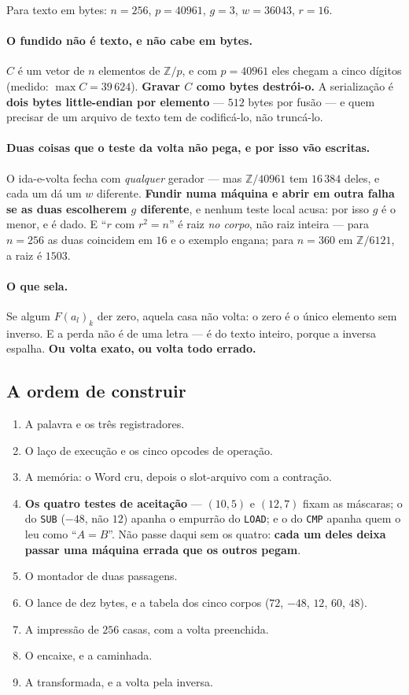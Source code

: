 \documentclass[11pt]{article}
\newcommand{\code}[1]{\texttt{\small #1}}
\newcommand{\Z}{\mathbb Z}
\theoremstyle{plain}
\theoremstyle{remark}
\begin{document}
\noindent Para texto em bytes: $n=256$, $p=40961$, $g=3$, $w=36043$, $r=16$.

\paragraph{O fundido não é texto, e não cabe em bytes.} $C$ é um vetor de $n$
elementos de $\Z/p$, e com $p=40961$ eles chegam a cinco dígitos (medido:
$\max C=39\,624$). \textbf{Gravar $C$ como bytes destrói-o.} A serialização é
\textbf{dois bytes little-endian por elemento} --- $512$ bytes por fusão --- e
quem precisar de um arquivo de texto tem de codificá-lo, não truncá-lo.

\paragraph{Duas coisas que o teste da volta não pega, e por isso vão escritas.}
O ida-e-volta fecha com \emph{qualquer} gerador --- mas $\Z/40961$ tem
$16\,384$ deles, e cada um dá um $w$ diferente. \textbf{Fundir numa máquina e
abrir em outra falha se as duas escolherem $g$ diferente}, e nenhum teste local
acusa: por isso $g$ é o menor, e é dado. E ``$r$ com $r^2=n$'' é raiz
\emph{no corpo}, não raiz inteira --- para $n=256$ as duas coincidem em $16$ e
o exemplo engana; para $n=360$ em $\Z/6121$, a raiz é $1503$.

\paragraph{O que sela.} Se algum $F(a_l)_k$ der zero, aquela casa não volta: o
zero é o único elemento sem inverso. E a perda não é de uma letra --- é do
texto inteiro, porque a inversa espalha. \textbf{Ou volta exato, ou volta todo
errado.}

\subsection{A ordem de construir}

\begin{enumerate}
\item A palavra e os três registradores.
\item O laço de execução e os cinco opcodes de operação.
\item A memória: o Word cru, depois o slot-arquivo com a contração.
\item \textbf{Os quatro testes de aceitação} --- $(10,5)$ e $(12,7)$ fixam as
 máscaras; o do \code{SUB} ($-48$, não $12$) apanha o empurrão do
 \code{LOAD}; e o do \code{CMP} apanha quem o leu como ``$A=B$''. Não passe
 daqui sem os quatro: \textbf{cada um deles deixa passar uma máquina
 errada que os outros pegam}.
\item O montador de duas passagens.
\item O lance de dez bytes, e a tabela dos cinco corpos ($72$, $-48$, $12$,
 $60$, $48$).
\item A impressão de $256$ casas, com a volta preenchida.
\item O encaixe, e a caminhada.
\item A transformada, e a volta pela inversa.
\end{enumerate}
\end{document}
